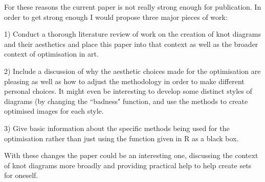 \documentclass[12pt]{article}
\begin{document}
For these reasons the current paper is not really strong enough for
publication. In order to get strong enough I would propose three major
pieces of work:

1) Conduct a thorough literature review of work on the creation of
knot diagrams and their aesthetics and place this paper into that
context as well as the broader context of optimisation in art.

2) Include a discussion of why the aesthetic choices made for the
optimisation are pleasing as well as how to adjust the methodology in
order to make different personal choices. It might even be interesting
to develop some distinct styles of diagrams (by changing the ``badness"
function, and use the methods to create optimised images for each
style.

3) Give basic information about the specific methods being used for
the optimisation rather than just using the function given in R as a
black box.

With these changes the paper could be an interesting one, discussing
the context of knot diagrams more broadly and providing practical help
to help create sets for oneself.
\end{document}
